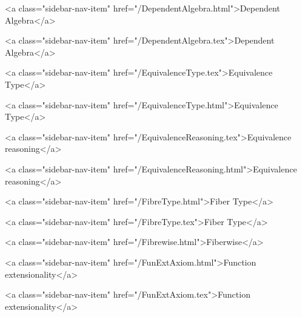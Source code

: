       
    
      
        
          <a class="sidebar-nav-item" href="/DependentAlgebra.html">Dependent Algebra</a>
        
      
    
      
        
          <a class="sidebar-nav-item" href="/DependentAlgebra.tex">Dependent Algebra</a>
        
      
    
      
        
          <a class="sidebar-nav-item" href="/EquivalenceType.tex">Equivalence Type</a>
        
      
    
      
        
          <a class="sidebar-nav-item" href="/EquivalenceType.html">Equivalence Type</a>
        
      
    
      
        
          <a class="sidebar-nav-item" href="/EquivalenceReasoning.tex">Equivalence reasoning</a>
        
      
    
      
        
          <a class="sidebar-nav-item" href="/EquivalenceReasoning.html">Equivalence reasoning</a>
        
      
    
      
        
          <a class="sidebar-nav-item" href="/FibreType.html">Fiber Type</a>
        
      
    
      
        
          <a class="sidebar-nav-item" href="/FibreType.tex">Fiber Type</a>
        
      
    
      
        
          <a class="sidebar-nav-item" href="/Fibrewise.html">Fiberwise</a>
        
      
    
      
        
          <a class="sidebar-nav-item" href="/FunExtAxiom.html">Function extensionality</a>
        
      
    
      
        
          <a class="sidebar-nav-item" href="/FunExtAxiom.tex">Function extensionality</a>
        
